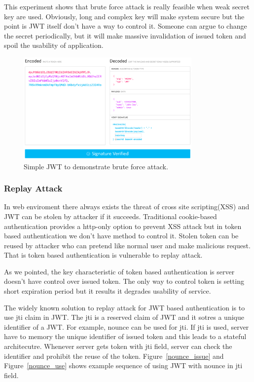 \documentclass[journal,article,submit,moreauthors,pdftex,10pt,a4paper]{mdpi}
\begin{document}
This experiment shows that brute force attack is really feasible when weak secret key are used. Obviously, long and complex key will make system secure but the point is JWT itself don't have a way to control it. Someone can argue to change the secret periodically, but it will make massive invalidation of issued token and spoil the usability of application.
\begin{figure}[H]
\centering
\includegraphics[width=9cm]{figures/bruteforce}
\caption{Simple JWT to demonstrate brute force attack.}
\label{bruteforce}
\end{figure}

\subsubsection{Replay Attack}

In web enviroment there always exists the threat of cross site scripting(XSS) and JWT can be stolen by attacker if it succeeds. Traditional cookie-based authentication provides a http-only option to prevent XSS attack but in token based authentication we don't have method to control it. Stolen token can be reused by attacker who can pretend like normal user and make malicious request. That is token based authentication is vulnerable to replay attack.

As we pointed, the key characteristic of token based authentication is server doesn't have control over issued token. The only way to control token is setting short expiration period but it results it degrades usability of service. 

The widely known solution to replay attack for JWT based authentication is to use jti claim in JWT. The jti is a reserved claim of JWT and it sotres a unique identifier of a JWT. For example, nounce can be used for jti. If jti is used, server have to memory the unique identifier of issued token and this leads to a stateful architecutre. Whenever server gets token with jti field, server can check the identifier and prohibit the reuse of the token. Figure~\ref{nounce_issue} and Figure~\ref{nounce_use} shows example sequence of using JWT with nounce in jti field.
\end{document}
